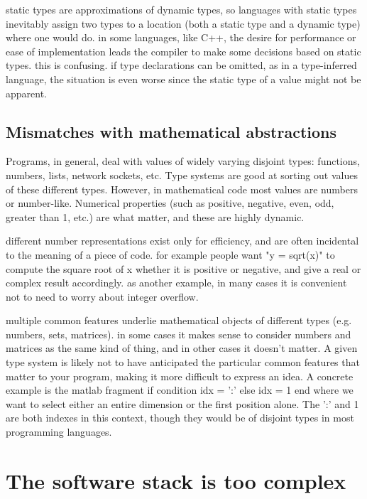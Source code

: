{static types are approximations of dynamic types, so languages with static
types inevitably assign two types to a location (both a static type and a
dynamic type) where one would do. in some languages, like C++, the desire
for performance or ease of implementation leads the compiler to make some
decisions based on static types. this is confusing. if type declarations
can be omitted, as in a type-inferred language, the situation is even worse
since the static type of a value might not be apparent.


\subsection{Mismatches with mathematical abstractions}

Programs, in general, deal with values of widely varying disjoint types:
functions, numbers, lists, network sockets, etc. Type systems
are good at sorting out values of these different types. However, in
mathematical code most values are numbers or number-like. Numerical properties (such as
positive, negative, even, odd, greater than 1, etc.) are what matter,
and these are highly dynamic.

different number representations exist only for efficiency, and are often
incidental to the meaning of a piece of code. for example people want
"y = sqrt(x)" to compute the square root of x whether it is positive or
negative, and give a real or complex result accordingly. as another
example, in many cases it is convenient not to need to worry about
integer overflow.


multiple common features underlie mathematical objects of different
types (e.g. numbers, sets, matrices). in some cases it makes sense to
consider numbers and matrices as the same kind of thing, and in other
cases it doesn't matter. A given type system is likely not to have
anticipated the particular common features that matter to your program,
making it more difficult to express an idea. A concrete example is
the matlab fragment
if condition
  idx = ':'
else
  idx = 1
end
where we want to select either an entire dimension or the first position
alone. The ':' and 1 are both indexes in this context, though they would
be of disjoint types in most programming languages.


\section{The software stack is too complex}

}
